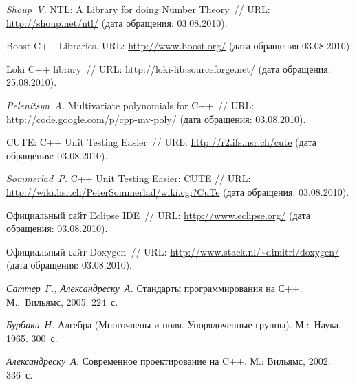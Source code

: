\documentclass[14pt]{extarticle}
\newcommand{\nspace}{\hspace{0pt}}
\newcommand{\nbdash}{\nobreakdash-\nspace}
\begin{document}
\begin{thebibliography}{99}
     \emph{Shoup~V.} NTL: A Library for doing Number Theory~//
    URL: \url{http://shoup.net/ntl/} (дата обращения: 03.08.2010).
    
     Boost C++ Libraries. URL: \url{http://www.boost.org/} (дата
    обращения 03.08.2010).
    
     Loki C++ library~// URL:
    \url{http://loki-lib.sourceforge.net/} (дата обращения: 25.08.2010). 
    
     \emph{Pelenitsyn~A.} Multivariate polynomials for C++~//
    URL: \url{http://code.google.com/p/cpp-mv-poly/} (дата обращения: 03.08.2010).
    
     CUTE: C++ Unit Testing Easier~// URL:
    \url{http://r2.ifs.hsr.ch/cute} (дата обращения: 03.08.2010).
    
     \emph{Sommerlad~P.} C++ Unit Testing Easier: CUTE // URL:
    \url{http://wiki.hsr.ch/PeterSommerlad/wiki.cgi?CuTe} (дата обращения:
    03.08.2010).
    
     Официальный сайт Eclipse IDE~// URL:
    \url{http://www.eclipse.org/} (дата обращения: 03.08.2010).
    
     Официальный сайт Doxygen~// URL:
    \url{http://www.stack.nl/~dimitri/doxygen/}
    (дата обращения: 03.08.2010).
    
    \emph{Саттер~Г., Александреску~А.} Стандарты программирования
    на С++. М.:~Вильямс, 2005. 224~с.
    
    \emph{Бурбаки~Н.} Алгебра (Многочлены и поля.
    Упорядоченные группы). М.:~Наука, 1965. 300~с.
    
    \emph{Александреску~А.} Современное проектирование
    на C++. М.: Вильямс, 2002. 336~с.
    
\end{thebibliography}
\end{document}
